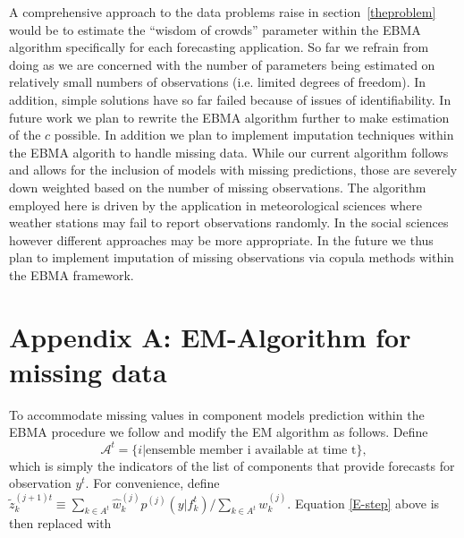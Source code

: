 \documentclass[12pt,fullpage,endnotes]{article}
\begin{document}
A comprehensive approach to the data problems raise in
section~\ref{theproblem} would be to estimate the ``wisdom of crowds''
parameter within the EBMA algorithm specifically for each forecasting
application. So far we refrain from doing as we are concerned with the
number of parameters being estimated on relatively small numbers of
observations (i.e. limited degrees of freedom). In addition, simple
solutions have so far failed because of issues of identifiability. In
future work we plan to rewrite the EBMA algorithm further to make
estimation of the $c$ possible.
In addition we plan to implement imputation techniques within the EBMA
algorith to handle missing data. While our current algorithm follows
\citet{Fraley:2010} and allows for the inclusion of models with
missing predictions, those are severely down weighted based on the
number of missing observations. The algorithm employed here is driven
by the application in meteorological sciences where weather stations
may fail to report observations randomly. In the social sciences
however different approaches may be more appropriate. In the future we
thus plan to implement imputation of missing observations via copula
methods within the EBMA framework.

\singlespacing




 \newpage
 \appendix

\doublespacing

 \section*{Appendix A: EM-Algorithm for missing data}

To accommodate missing values in component models prediction within
the EBMA procedure we follow \citet{Fraley:2010} and modify the EM
algorithm as follows.  Define $$\mathcal{A}^t = \{i|\mbox{ensemble
  member i available at time t}\},$$\noindent which is simply the
indicators of the list of components that provide forecasts for
observation $y^t$.  For convenience, define $\tilde{z}_k^{(j+1)t}
\equiv {{\underset{k \in
      A^t}{\sum}}\hat{w}^{(j)}_kp^{(j)}(y|f_{k}^{t})}/{\underset{k \in
    A^t}\sum w_k^{(j)}}$.  Equation \ref{E-step} above is then
replaced with
\end{document}
